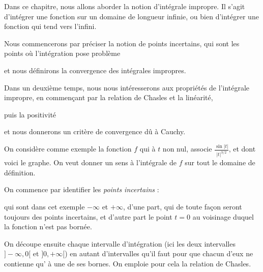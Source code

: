 







\debuttexte


\diapo

Dans ce chapitre, nous allons aborder la notion d'intégrale impropre. 
Il s'agit d'intégrer une fonction sur un domaine de longueur infinie, 
ou bien d'intégrer une fonction qui tend vers l'infini.


\change

\change

 Nous commencerons par préciser la notion de  points incertains, 
 qui sont les points où l'intégration pose problème

\change

 et nous définirons la convergence des intégrales impropres.

\change

Dans un deuxième temps, nous nous intéresserons aux propriétés de 
l'intégrale impropre, en commençant par la relation de Chasles et la linéarité,

\change 

puis la positivité

\change

et nous donnerons un critère de convergence dû à Cauchy.



\diapo

 On considère comme exemple la fonction $f$ qui à 
 $t$ non nul, associe $\displaystyle \frac{\sin |t|}{|t|^{3/2}}$, 
 et dont voici le graphe. On veut donner un sens à l'intégrale de 
 $f$ sur tout le domaine de définition.

 \change
 On commence  par identifier les \emph{points incertains} :
 
 qui sont dans cet exemple $-\infty$ et $+\infty$, d'une part,
 qui de toute façon seront toujours des points incertains, 
 et d'autre part le point $t=0$ au voisinage duquel 
 la fonction n'est pas bornée.


 \change
 On découpe ensuite chaque intervalle d'intégration 
 (ici les deux intervalles $]-\infty,0[$ et $]0,+\infty[$) en autant 
 d'intervalles qu'il faut pour que chacun d'eux ne contienne 
 qu' à une de ses bornes. 
 On emploie pour cela la relation de Chasles.

